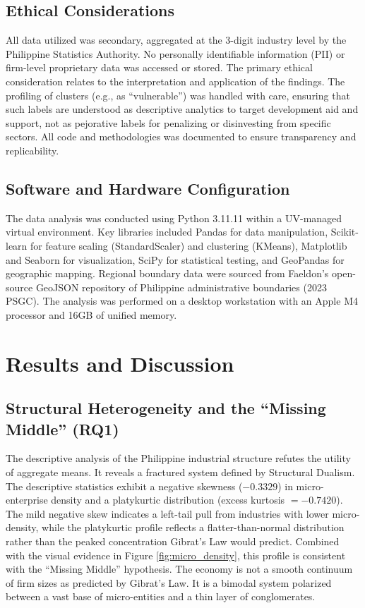\documentclass[acmtog, nonacm]{acmart}
\begin{document}
\subsection{Ethical Considerations}
All data utilized was secondary, aggregated at the 3-digit industry level by the Philippine Statistics Authority. No personally identifiable information (PII) or firm-level proprietary data was accessed or stored. The primary ethical consideration relates to the interpretation and application of the findings. The profiling of clusters (e.g., as ``vulnerable'') was handled with care, ensuring that such labels are understood as descriptive analytics to target development aid and support, not as pejorative labels for penalizing or disinvesting from specific sectors. All code and methodologies was documented to ensure transparency and replicability.

\subsection{Software and Hardware Configuration}
The data analysis was conducted using Python 3.11.11 within a UV-managed virtual environment. Key libraries included Pandas for data manipulation, Scikit-learn for feature scaling (StandardScaler) and clustering (KMeans), Matplotlib and Seaborn for visualization, SciPy for statistical testing, and GeoPandas for geographic mapping. Regional boundary data were sourced from Faeldon's open-source GeoJSON repository of Philippine administrative boundaries (2023 PSGC). The analysis was performed on a desktop workstation with an Apple M4 processor and 16GB of unified memory. 

\section{Results and Discussion}

\subsection{Structural Heterogeneity and the ``Missing Middle'' (RQ1)}
The descriptive analysis of the Philippine industrial structure refutes the utility of aggregate means. It reveals a fractured system defined by Structural Dualism. The descriptive statistics exhibit a negative skewness ($-0.3329$) in micro-enterprise density and a platykurtic distribution (excess kurtosis $= -0.7420$). The mild negative skew indicates a left-tail pull from industries with lower micro-density, while the platykurtic profile reflects a flatter-than-normal distribution rather than the peaked concentration Gibrat's Law would predict. Combined with the visual evidence in Figure \ref{fig:micro_density}, this profile is consistent with the ``Missing Middle'' hypothesis. The economy is not a smooth continuum of firm sizes as predicted by Gibrat's Law. It is a bimodal system polarized between a vast base of micro-entities and a thin layer of conglomerates.
\end{document}
